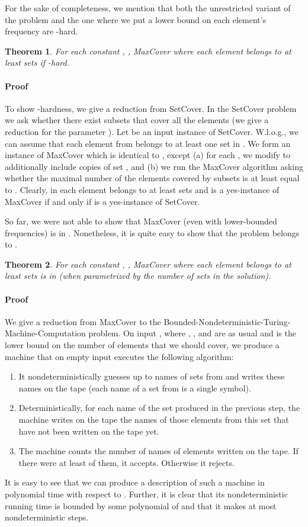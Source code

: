 \documentclass[11pt]{article}
\newtheorem{theorem}{Theorem}
\newenvironment{proof}{\paragraph{Proof}}{\hfill\medskip}
\begin{document}
For the sake of completeness, we mention that both the unrestricted
variant of the problem and the one where we put a lower bound on each
element's frequency are -hard.

\begin{theorem}
  For each constant , , MaxCover where each element
  belongs to at least  sets if -hard.
\end{theorem}
\begin{proof}
  To show -hardness, we give a reduction from SetCover. In the SetCover
  problem we ask whether there exist  subsets that cover all the elements
  (we give a reduction for the parameter ).
  Let  be an input instance of
  SetCover.  W.l.o.g., we can assume that each element from 
  belongs to at least one set in . We form an instance  of
  MaxCover which is identical to , except (a) for each ,
  we modify  to  additionally include  copies of set , and
  (b) we run the MaxCover algorithm asking whether the maximal number of the
  elements covered by  subsets is at least equal to .
  Clearly, in  each element belongs to at least  sets
  and  is a yes-instance of MaxCover if and only if  is a
  yes-instance of SetCover.~
\end{proof}

So far, we were not able to show that MaxCover (even with
lower-bounded frequencies) is in . Nonetheless, it is quite
easy to show that the problem belongs to .

\begin{theorem}
  For each constant , , MaxCover where each element
  belongs to at least  sets is in  (when parametrized by
  the number of sets in the solution).
\end{theorem}
\begin{proof}
  We give a reduction from MaxCover to the
  Bounded-Nondeterministic-Turing-Machine-Computation problem. On
  input , where , , and  are as usual
  and  is the lower bound on the number of elements that we should
  cover, we produce a machine that on empty input executes the following
  algorithm:
  \begin{enumerate}
  \item It nondeterministically guesses up to  names of sets from
     and writes these names on the tape (each name of a set
    from  is a single symbol).
  \item Deterministically, for each name of the set produced in the
    previous step, the machine writes on the tape the names of those
    elements from this set that have not been written on the tape yet.
  \item The machine counts the number of names of elements written on
    the tape.  If there were at least  of them, it accepts. Otherwise
    it rejects.
  \end{enumerate}
  It is easy to see that we can produce a description of such a
  machine in polynomial time with respect to . Further, it is
  clear that its nondeterministic running time is bounded by some
  polynomial of  and that it makes at most  nondeterministic
  steps.
\end{proof}
\end{document}
